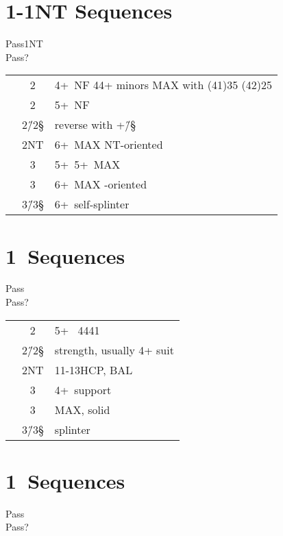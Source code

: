 \section{1\D-1NT Sequences}

\begin{bidding}
\>\D\>Pass\>1NT\\
\>Pass\>?\\
\end{bidding}

\begin{longtable}{C{\linklength} C{\bidlength} l}
& 2\C & 4+\C\ NF  44+ minors  MAX with (41)35 (42)25 \\
& 2\D & 5+\D\ NF\\
& 2\H/2\S & reverse with \D+\H/\S\\
& 2NT & 6+\D\ MAX NT-oriented \\
& 3\C & 5+\C\ 5+\D\ MAX \\
& 3\D & 6+\D\ MAX \D-oriented \\
& 3\H/3\S & 6+\D\ self-splinter\\
\end{longtable}

\section{1\C\ Sequences}

\begin{bidding}
\>\D\>Pass\C\\
\>Pass\>?\\
\end{bidding}

\begin{longtable}{C{\linklength} C{\bidlength} l}
& 2\D &  5+\D\  4441\C \\
& 2\H/2\S & strength, usually 4+ suit \\
& 2NT & 11-13HCP, BAL \\
& 3\C & 4+\C\ support \\
& 3\D & MAX, solid \D \\
& 3\H/3\S & splinter\\
\end{longtable}

\section{1\D\ Sequences}

\begin{bidding}
\>\D\>Pass\D\\
\>Pass\>?\\
\end{bidding}

